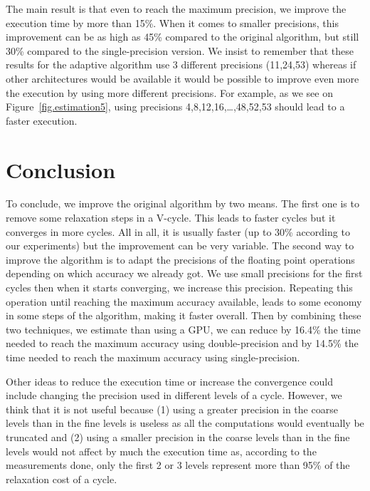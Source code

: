 \documentclass[sigplan]{acmart}
\begin{document}
   The main result is that even to reach the maximum precision, we improve the execution time by more than 15\%. When it comes to smaller precisions, this improvement can be as high as 45\% compared to
   the original algorithm, but still 30\% compared to the single-precision version. We insist to remember that these results for the adaptive algorithm use 3 different precisions (11,24,53)
   whereas if other architectures would be available it would be possible to improve even more the execution by using more different precisions. For example, as we see on Figure~\ref{fig.estimation5}, using precisions
   4,8,12,16,\dots,48,52,53 should lead to a faster execution.
   
   \section{Conclusion}
   
   To conclude, we improve the original algorithm by two means. The first one is to remove some relaxation steps in a V-cycle. This leads to faster cycles but it converges in more cycles. All in all,
   it is usually faster (up to 30\% according to our experiments) but the improvement can be very variable. The second way to improve the algorithm is to adapt the precisions of the floating point
   operations depending on which accuracy we already got. We use small precisions for the first cycles then when it starts converging, we increase this precision. Repeating this operation until reaching the maximum accuracy available, leads
   to some economy in some steps of the algorithm, making it faster overall. Then by combining these two techniques, we estimate than using a GPU, we can reduce by 16.4\% the time needed to reach the maximum accuracy using double-precision and by 14.5\% the time needed
   to reach the maximum accuracy using single-precision.
   
   Other ideas to reduce the execution time or increase the convergence could include changing the precision used in different levels of a cycle. However, we think that it is not
   useful because (1) using a greater precision in the coarse levels than in the fine levels is useless as all the computations would eventually be truncated and (2) using a smaller
   precision in the coarse levels than in the fine levels would not affect by much the execution time as, according to the measurements done, only the first 2 or 3 levels represent more than 95\% of the relaxation cost of a cycle.
   
   
   
\end{document}
